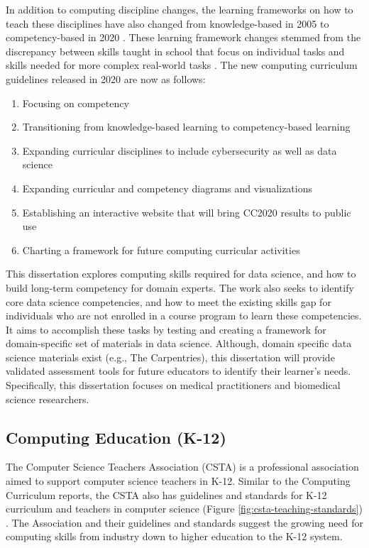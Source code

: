\documentclass[010-intro.tex]{subfiles}
\begin{document}
    In addition to computing discipline changes,
    the learning frameworks on how to teach these disciplines have also changed
    from knowledge-based in 2005 to competency-based in 2020
    \cite{cc2020}.
    These learning framework changes stemmed from the discrepancy between
    skills taught in school that focus on individual tasks and skills needed for more complex real-world tasks
    \cite{cc2020}.
    The new computing curriculum guidelines released in 2020 are now as follows:

    \begin{enumerate}
        \item Focusing on competency
        \item Transitioning from knowledge-based learning to competency-based learning
        \item Expanding curricular disciplines to include cybersecurity as well as data science
        \item Expanding curricular and competency diagrams and visualizations
        \item Establishing an interactive website that will bring CC2020 results to public use
        \item Charting a framework for future computing curricular activities
    \end{enumerate}

    This dissertation explores computing skills required for data science,
    and how to build long-term competency for domain experts.
    The work also seeks to identify core data science competencies,
    and how to meet the existing skills gap for individuals who are not enrolled
    in a course program to learn these competencies.
    It aims to accomplish these tasks by
    testing and creating a framework for domain-specific set of materials in data science.
    Although, domain specific data science materials exist (e.g., The Carpentries),
    this dissertation will provide validated assessment tools for future educators to identify their
    learner's needs.
    Specifically, this dissertation focuses on medical practitioners and biomedical science researchers.

\subsection{Computing Education (K-12)}
\label{sse:computek12}

    The Computer Science Teachers Association (CSTA)
    is a professional association aimed to support computer science teachers in K-12.
    Similar to the Computing Curriculum reports,
    the CSTA also has guidelines and standards for K-12 curriculum and teachers in computer science
    (Figure \ref{fig:csta-teaching-standards})
    \cite{csta2017}.
    The Association and their guidelines and standards suggest the growing need for computing skills from
    industry down to higher education to the K-12 system.
\end{document}

